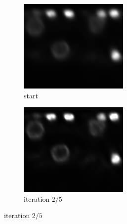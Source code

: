 \begin{figure}[h]
  \centering
  \hfill
  \begin{subfigure}[b]{0.3\textwidth}
    \includegraphics[width=\textwidth]{img/janosch_celegans_DAPI_nuclei_it1}
    \caption{start}
    \label{fig:iterate_start}
  \end{subfigure}%
  \hfill
  \begin{subfigure}[b]{0.3\textwidth}
    \includegraphics[width=\textwidth]{img/janosch_celegans_DAPI_nuclei_it3}
    \caption{iteration $2/5$}

\end{subfigure}
\end{figure}
